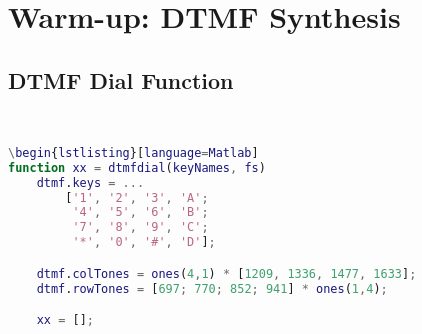 \section{Warm-up: DTMF Synthesis}
\subsection{DTMF Dial Function}
\begin{lstlisting}[language=Matlab]


\begin{lstlisting}[language=Matlab]
function xx = dtmfdial(keyNames, fs)
    dtmf.keys = ...
        ['1', '2', '3', 'A';
         '4', '5', '6', 'B';
         '7', '8', '9', 'C';
         '*', '0', '#', 'D'];

    dtmf.colTones = ones(4,1) * [1209, 1336, 1477, 1633];
    dtmf.rowTones = [697; 770; 852; 941] * ones(1,4);

    xx = [];


\end{lstlisting}

